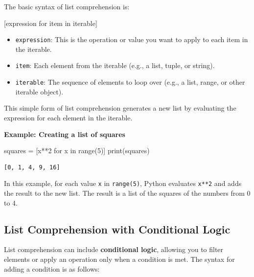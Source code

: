 \documentclass[
  letterpaper,
  DIV=11,
  numbers=noendperiod]{scrreprt}
\newenvironment{Shaded}{\begin{snugshade}}{\end{snugshade}}
\newcommand{\BuiltInTok}[1]{\textcolor[rgb]{0.00,0.23,0.31}{#1}}
\newcommand{\ControlFlowTok}[1]{\textcolor[rgb]{0.00,0.23,0.31}{#1}}
\newcommand{\DecValTok}[1]{\textcolor[rgb]{0.68,0.00,0.00}{#1}}
\newcommand{\KeywordTok}[1]{\textcolor[rgb]{0.00,0.23,0.31}{#1}}
\newcommand{\NormalTok}[1]{\textcolor[rgb]{0.00,0.23,0.31}{#1}}
\newcommand{\OperatorTok}[1]{\textcolor[rgb]{0.37,0.37,0.37}{#1}}
\providecommand{\tightlist}{%
  \setlength{\itemsep}{0pt}\setlength{\parskip}{0pt}}\usepackage{longtable,booktabs,array}
\begin{document}
The basic syntax of list comprehension is:

\begin{Shaded}
\begin{Highlighting}[]
\NormalTok{[expression }\ControlFlowTok{for}\NormalTok{ item }\KeywordTok{in}\NormalTok{ iterable]}
\end{Highlighting}
\end{Shaded}

\begin{itemize}
\tightlist
\item
  \texttt{expression}: This is the operation or value you want to apply
  to each item in the iterable.
\item
  \texttt{item}: Each element from the iterable (e.g., a list, tuple, or
  string).
\item
  \texttt{iterable}: The sequence of elements to loop over (e.g., a
  list, range, or other iterable object).
\end{itemize}

This simple form of list comprehension generates a new list by
evaluating the expression for each element in the iterable.

\textbf{Example: Creating a list of squares}

\begin{Shaded}
\begin{Highlighting}[]
\NormalTok{squares }\OperatorTok{=}\NormalTok{ [x}\OperatorTok{**}\DecValTok{2} \ControlFlowTok{for}\NormalTok{ x }\KeywordTok{in} \BuiltInTok{range}\NormalTok{(}\DecValTok{5}\NormalTok{)]}
\BuiltInTok{print}\NormalTok{(squares) }
\end{Highlighting}
\end{Shaded}

\begin{verbatim}
[0, 1, 4, 9, 16]
\end{verbatim}

In this example, for each value \texttt{x} in \texttt{range(5)}, Python
evaluates \texttt{x**2} and adds the result to the new list. The result
is a list of the squares of the numbers from 0 to 4.

\hypertarget{list-comprehension-with-conditional-logic}{%
\subsection{List Comprehension with Conditional
Logic}\label{list-comprehension-with-conditional-logic}}

List comprehension can include \textbf{conditional logic}, allowing you
to filter elements or apply an operation only when a condition is met.
The syntax for adding a condition is as follows:
\end{document}
